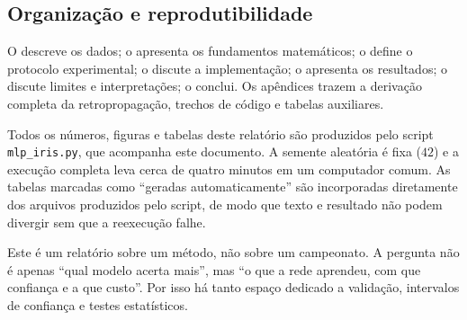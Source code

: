 \subsection{Organização e reprodutibilidade}

O  descreve os dados; o  apresenta os fundamentos matemáticos; o
 define o protocolo experimental; o  discute a implementação; o
 apresenta os resultados; o  discute limites e
interpretações; o  conclui. Os apêndices trazem a derivação completa da
retropropagação, trechos de código e tabelas auxiliares.

Todos os números, figuras e tabelas deste relatório são produzidos pelo script
\texttt{mlp\_iris.py}, que acompanha este documento. A semente aleatória é fixa ($42$) e a execução
completa leva cerca de quatro minutos em um computador comum. As tabelas marcadas como
``geradas automaticamente'' são incorporadas diretamente dos arquivos produzidos pelo script, de
modo que texto e resultado não podem divergir sem que a reexecução falhe.

\begin{observacao}
Este é um relatório sobre um método, não sobre um campeonato. A pergunta não é apenas ``qual modelo
acerta mais'', mas ``o que a rede aprendeu, com que confiança e a que custo''. Por isso há tanto
espaço dedicado a validação, intervalos de confiança e testes estatísticos.
\end{observacao}
